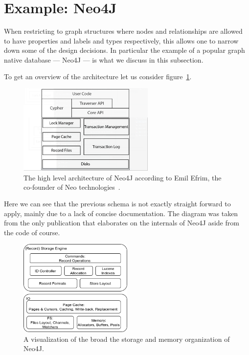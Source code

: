 \section{Example: Neo4J}\label{\positionnumber}
    When restricting to graph structures where nodes and relationships are allowed to have properties and labels and types respectively, this allows one to narrow down some of the design decisions.
    In particular the example of a popular graph native database --- Neo4J --- is what we discuss in this subsection.

    To get an overview of the architecture let us consider figure~\ref{N4J_HLA_Emil}. 

    \begin{figure}[htp]
    \begin{center}
    \includegraphics[keepaspectratio,width=0.6\textwidth]{img/00_intro/N4J_HLA_Emil.png}
    \end{center}
    \caption{The high level architecture of Neo4J according to Emil Efrim, the co-founder of Neo technologies~\autocite{robinson2015graph}.} 
    \label{N4J_HLA_Emil}
    \end{figure}

    Here we can see that the previous schema is not exactly straight forward to apply, mainly due to a lack of concise documentation.
    The diagram was taken from the only publication that elaborates on the internals of Neo4J aside from the code of course.
    
    \begin{figure}[htp]
    \begin{center}
    \includegraphics[keepaspectratio,width=0.5\textwidth,height=0.3\textheight]{img/00_intro/N4J_Storage.png}
    \end{center}
    \caption{A visualization of the broad the storage and memory organization of Neo4J.} \label{N4J_Storage}
    \end{figure}
    
